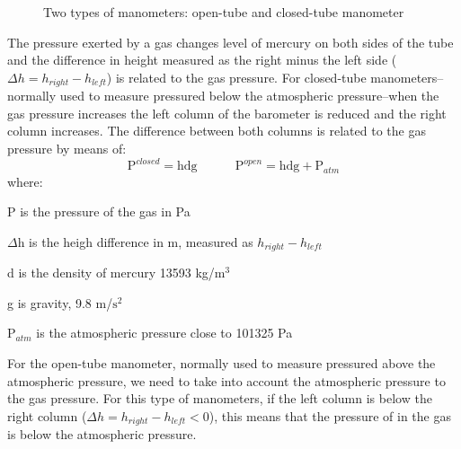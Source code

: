 \documentclass[main.tex]{subfiles}
\begin{document}
\begin{description}
\begin{figure}
\caption{Two types of manometers: open-tube and closed-tube manometer}
\label{fig:{\chapterlabel}2}
\end{figure}%




The pressure exerted by a gas changes level of mercury on both sides of the tube and the difference in height measured as the right minus the left side ($\Delta h=h_{right}-h_{left}$) is related to the gas pressure. For closed-tube manometers--normally used to measure pressured below the atmospheric pressure--when the gas pressure increases the left column of the barometer is reduced and the right column increases. The difference between both columns is related to the gas pressure by means of:
\begin{equation}
\boxed{   \text{P}^{closed}=\text{hdg}} \quad\quad\quad  \boxed{ \text{P}^{open}=\text{hdg}+\text{P}_{atm}}    
\end{equation}
where:
\begin{where}
 \item P   is the pressure of the gas in Pa
\item $\Delta$h is the heigh difference in m, measured as $h_{right}-h_{left}$
 \item d   is the density of mercury 13593 kg/$\text{m}^3$
\item g   is gravity, 9.8 m/$\text{s}^2$
\item $\text{P}_{atm}$   is the atmospheric pressure close to 101325 Pa
\end{where}

For the open-tube manometer, normally used to measure pressured above the atmospheric pressure, we need to take into account the atmospheric pressure to the gas pressure. For this type of manometers, if the left column is below the right column ($\Delta h=h_{right}-h_{left}<0$), this means that the pressure of in the gas is below the atmospheric pressure.




\end{description}
\end{document}
